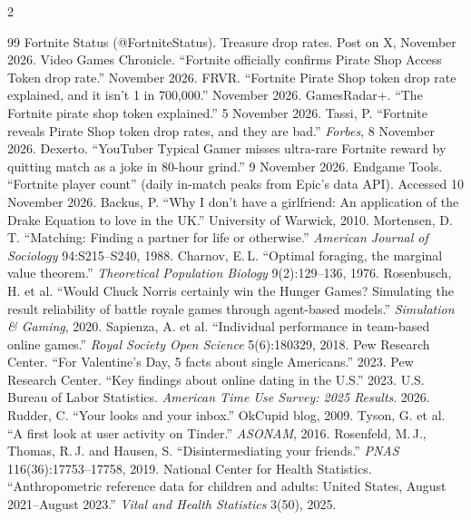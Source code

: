 \documentclass[11pt]{article}
\theoremstyle{definition}
\theoremstyle{plain}
\begin{document}
\begin{multicols}{2}

\begin{thebibliography}{99}
\scriptsize\setlength{\itemsep}{0pt}
 Fortnite Status (@FortniteStatus). Treasure drop rates. Post on X, November 2026.
 Video Games Chronicle. ``Fortnite officially confirms Pirate Shop Access Token drop rate.'' November 2026.
 FRVR. ``Fortnite Pirate Shop token drop rate explained, and it isn't 1 in 700,000.'' November 2026.
 GamesRadar+. ``The Fortnite pirate shop token explained.'' 5 November 2026.
 Tassi, P. ``Fortnite reveals Pirate Shop token drop rates, and they are bad.'' \textit{Forbes}, 8 November 2026.
 Dexerto. ``YouTuber Typical Gamer misses ultra-rare Fortnite reward by quitting match as a joke in 80-hour grind.'' 9 November 2026.
 Endgame Tools. ``Fortnite player count'' (daily in-match peaks from Epic's data API). Accessed 10 November 2026.
 Backus, P. ``Why I don't have a girlfriend: An application of the Drake Equation to love in the UK.'' University of Warwick, 2010.
 Mortensen, D.\,T. ``Matching: Finding a partner for life or otherwise.'' \textit{American Journal of Sociology} 94:S215--S240, 1988.
 Charnov, E.\,L. ``Optimal foraging, the marginal value theorem.'' \textit{Theoretical Population Biology} 9(2):129--136, 1976.
 Rosenbusch, H. et al. ``Would Chuck Norris certainly win the Hunger Games? Simulating the result reliability of battle royale games through agent-based models.'' \textit{Simulation \& Gaming}, 2020.
 Sapienza, A. et al. ``Individual performance in team-based online games.'' \textit{Royal Society Open Science} 5(6):180329, 2018.
 Pew Research Center. ``For Valentine's Day, 5 facts about single Americans.'' 2023.
 Pew Research Center. ``Key findings about online dating in the U.S.'' 2023.
 U.S. Bureau of Labor Statistics. \textit{American Time Use Survey: 2025 Results}. 2026.
 Rudder, C. ``Your looks and your inbox.'' OkCupid blog, 2009.
 Tyson, G. et al. ``A first look at user activity on Tinder.'' \textit{ASONAM}, 2016.
 Rosenfeld, M.\,J., Thomas, R.\,J. and Hausen, S. ``Disintermediating your friends.'' \textit{PNAS} 116(36):17753--17758, 2019.
 National Center for Health Statistics. ``Anthropometric reference data for children and adults: United States, August 2021--August 2023.'' \textit{Vital and Health Statistics} 3(50), 2025.

\end{thebibliography}
\end{multicols}
\end{document}
